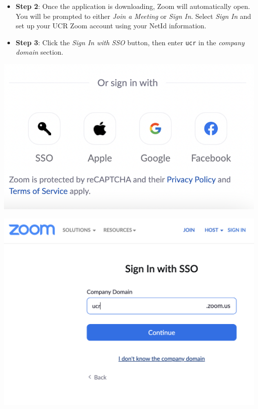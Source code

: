\documentclass[
]{book}
\begin{document}
\begin{itemize}
\item
  \textbf{Step 2}: Once the application is downloading, Zoom will automatically open. You will be prompted to either \emph{Join a Meeting} or \emph{Sign In}. Select \emph{Sign In} and set up your UCR Zoom account using your NetId information.
\item
  \textbf{Step 3}: Click the \emph{Sign In with SSO} button, then enter \texttt{ucr} in the \emph{company domain} section.
\end{itemize}

\begin{center}\includegraphics{images/zoomsso} \end{center}

\begin{center}\includegraphics{images/zoomdomain} \end{center}
\end{document}
